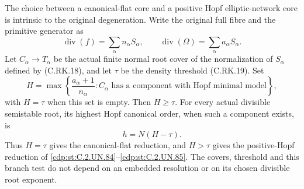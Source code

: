 \begin{proposition}
The choice between a canonical-flat core and a positive
Hopf elliptic-network core is intrinsic to the original
degeneration. Write the original full fibre and the
primitive generator as
\[
        \operatorname{div}(f)=\sum_\alpha n_\alpha S_\alpha,
        \qquad \operatorname{div}(\Omega)
                       =\sum_\alpha a_\alpha S_\alpha.
 \tag{C.AR.6}\label{cdp:eq:C.AR.6}
\]
Let \(C_\alpha\to T_\alpha\) be the actual finite normal
root cover of the normalization of \(S_\alpha\) defined
by (C.RK.18), and let \(\tau\) be the density threshold
(C.RK.19). Set
\[
 H=\max\left\{\frac{a_\alpha+1}{n_\alpha}:
       C_\alpha\text{ has a component with Hopf minimal model}
       \right\},
 \tag{C.AR.7}\label{cdp:eq:C.AR.7}
\]
with \(H=\tau\) when this set is empty. Then \(H\ge\tau\).
For every actual divisible semistable root, its highest
Hopf canonical order, when such a component exists, is
\[
                         h=N(H-\tau).
 \tag{C.AR.8}\label{cdp:eq:C.AR.8}
\]
Thus \(H=\tau\) gives the canonical-flat reduction,
and \(H>\tau\) gives the positive-Hopf reduction of
\ref{cdp:st:C.2.UN.84}--\ref{cdp:st:C.2.UN.85}. The covers, threshold and this branch test
do not depend on an embedded resolution or on its
chosen divisible root exponent.
\end{proposition}

